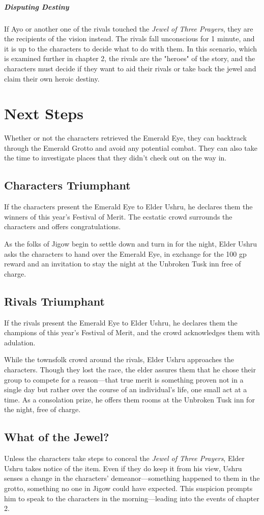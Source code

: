 \documentclass[10pt,a4paper,twoside,fancy,bg=print,twocolumn,openany,nodeprecatedcode]{dndbook}
\begin{document}
\subparagraph{Disputing Destiny}
If Ayo or another one of the rivals touched the \textit{Jewel of Three Prayers}, they are the recipients of the vision instead. The rivals fall unconscious for 1 minute, and it is up to the characters to decide what to do with them. In this scenario, which is examined further in chapter 2, the rivals are the "heroes" of the story, and the characters must decide if they want to aid their rivals or take back the jewel and claim their own heroic destiny.

\section{Next Steps}
Whether or not the characters retrieved the Emerald Eye, they can backtrack through the Emerald Grotto and avoid any potential combat. They can also take the time to investigate places that they didn't check out on the way in.

\subsection{Characters Triumphant}
If the characters present the Emerald Eye to Elder Ushru, he declares them the winners of this year's Festival of Merit. The ecstatic crowd surrounds the characters and offers congratulations.

As the folks of Jigow begin to settle down and turn in for the night, Elder Ushru asks the characters to hand over the Emerald Eye, in exchange for the 100 gp reward and an invitation to stay the night at the Unbroken Tusk inn free of charge.

\subsection{Rivals Triumphant}
If the rivals present the Emerald Eye to Elder Ushru, he declares them the champions of this year's Festival of Merit, and the crowd acknowledges them with adulation.

While the townsfolk crowd around the rivals, Elder Ushru approaches the characters. Though they lost the race, the elder assures them that he chose their group to compete for a reason—that true merit is something proven not in a single day but rather over the course of an individual's life, one small act at a time. As a consolation prize, he offers them rooms at the Unbroken Tusk inn for the night, free of charge.

\subsection{What of the Jewel?}
Unless the characters take steps to conceal the \textit{Jewel of Three Prayers}, Elder Ushru takes notice of the item. Even if they do keep it from his view, Ushru senses a change in the characters' demeanor—something happened to them in the grotto, something no one in Jigow could have expected. This suspicion prompts him to speak to the characters in the morning—leading into the events of chapter 2.
\end{document}
